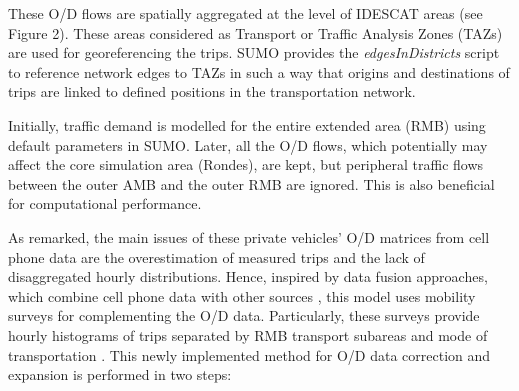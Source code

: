 These O/D flows are spatially aggregated at the level of IDESCAT areas (see Figure 2). These areas considered as Transport or Traffic Analysis Zones (TAZs) are used for georeferencing the trips. SUMO provides the \emph{edgesInDistricts} script \citep{GermanAerospaceCenterDLRandOthers2021} to reference network edges to TAZs in such a way that origins and destinations of trips are linked to defined positions in the transportation network.

Initially, traffic demand is modelled for the entire extended area (RMB) using default parameters in SUMO. Later, all the O/D flows, which potentially may affect the core simulation area (Rondes), are kept, but peripheral traffic flows between the outer AMB and the outer RMB are ignored. This is also beneficial for computational performance.

As remarked, the main issues of these private vehicles’ O/D matrices from cell phone data are the overestimation of measured trips and the lack of disaggregated hourly distributions. Hence, inspired by data fusion approaches, which combine cell phone data with other sources \citep{Montero2019}, this model uses mobility surveys for complementing the O/D data. Particularly, these surveys provide hourly histograms of trips separated by RMB transport subareas and mode of transportation \citep{InstitutdEstudisRegionalsiMetropolitansdeBarcelonaIERMB2020}. This newly implemented method for O/D data correction and expansion is performed in two steps:

